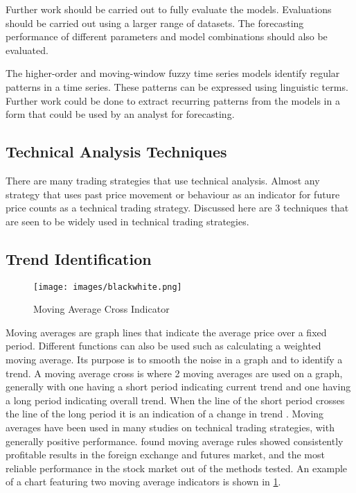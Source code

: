 \documentclass[12pt, oneside, a4paper]{article}
\theoremstyle{definition}
\begin{document}
Further work should be carried out to fully evaluate the models. Evaluations should be carried out using a larger range of datasets. The forecasting performance of different parameters and model combinations should also be evaluated.

The higher-order and moving-window fuzzy time series models identify regular patterns in a time series. These patterns can be expressed using linguistic terms. Further work could be done to extract recurring patterns from the models in a form that could be used by an analyst for forecasting.
\newpage
{}



\newpage
\appendix
\begin{appendices}

\section{Technical Analysis Techniques}

\label{app:tatechniques}

There are many trading strategies that use technical analysis. Almost any strategy that uses past price movement or behaviour as an indicator for future price counts as a technical trading strategy. Discussed here are 3 techniques that are seen to be widely used in technical trading strategies.

\subsection{Trend Identification}

\begin{figure}[H]
    \centering
    \caption{Moving Average Cross Indicator}
    \texttt{[image: images/blackwhite.png]}
    \label{ma}
\end{figure}

Moving averages are graph lines that indicate the average price over a fixed period. Different functions can also be used such as calculating a weighted moving average. Its purpose is to smooth the noise in a graph and to identify a trend. A moving average cross is where 2 moving averages are used on a graph, generally with one having a short period indicating current trend and one having a long period indicating overall trend. When the line of the short period crosses the line of the long period it is an indication of a change in trend \citep{brock1992}. Moving averages have been used in many studies on technical trading strategies, with generally positive performance. \cite{taprofitability} found moving average rules showed consistently profitable results in the foreign exchange and futures market, and the most reliable performance in the stock market out of the methods tested. An example of a chart featuring two moving average indicators is shown in \cref{ma}.


\end{appendices}
\end{document}
